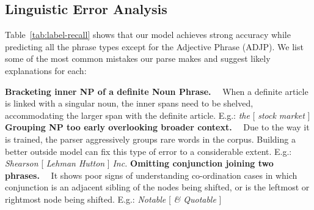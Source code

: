 \documentclass[11pt]{article}
\newcommand{\para}[1]{\vskip 1mm\noindent\textbf{#1}~~}
\begin{document}
\subsection{Linguistic Error Analysis}
\label{ssec:error-analysis}

Table~\ref{tab:label-recall} shows that our model achieves strong accuracy while predicting all the phrase types except for the Adjective Phrase (ADJP). We list some of the most common mistakes our parse makes and suggest likely explanations for each:

\para{Bracketing inner NP of a definite Noun Phrase.} When a definite article is linked with a singular noun, the inner spans need to be shelved, accommodating the larger span with the definite article. E.g.: \textit{the} [ \textit{stock market} ] 
\para{Grouping NP too early overlooking broader context.} Due to the way it is trained, the parser aggressively groups rare words in the corpus. Building a better outside model can fix this type of error to a considerable extent. E.g.: \textit{Shearson} [ \textit{Lehman Hutton} ] \textit{Inc.}
\para{Omitting conjunction joining two phrases.} It shows poor signs of understanding co-ordination cases in which conjunction is an adjacent sibling of the nodes being shifted, or is the leftmost or rightmost node being shifted. E.g.: \textit{Notable} [ \textit{\& Quotable} ]
\end{document}
